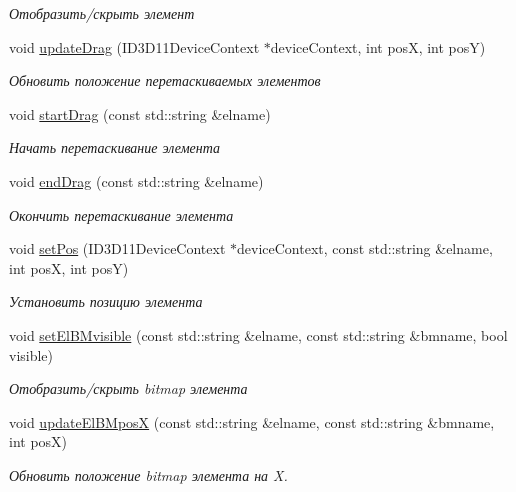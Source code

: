 \begin{DoxyCompactItemize}
\begin{DoxyCompactList}\small\item\em Отобразить/скрыть элемент \end{DoxyCompactList}\item 
void \hyperlink{class_interface_class_a0d1f5eb36e67f759bc4a61848cf27407}{update\+Drag} (I\+D3\+D11\+Device\+Context $\ast$device\+Context, int posX, int posY)
\begin{DoxyCompactList}\small\item\em Обновить положение перетаскиваемых элементов \end{DoxyCompactList}\item 
void \hyperlink{class_interface_class_aaa004dc4daea8a34d44d69678f7aee21}{start\+Drag} (const std\+::string \&elname)
\begin{DoxyCompactList}\small\item\em Начать перетаскивание элемента \end{DoxyCompactList}\item 
void \hyperlink{class_interface_class_a36e86575c8619d310c53fbdeff99b2fe}{end\+Drag} (const std\+::string \&elname)
\begin{DoxyCompactList}\small\item\em Окончить перетаскивание элемента \end{DoxyCompactList}\item 
void \hyperlink{class_interface_class_a969d115b4c904614a9f8a65bc64b062c}{set\+Pos} (I\+D3\+D11\+Device\+Context $\ast$device\+Context, const std\+::string \&elname, int posX, int posY)
\begin{DoxyCompactList}\small\item\em Установить позицию элемента \end{DoxyCompactList}\item 
void \hyperlink{class_interface_class_ad3a97e9c3d3d96dc725138952a9b3882}{set\+El\+B\+Mvisible} (const std\+::string \&elname, const std\+::string \&bmname, bool visible)
\begin{DoxyCompactList}\small\item\em Отобразить/скрыть bitmap элемента \end{DoxyCompactList}\item 
void \hyperlink{class_interface_class_aee673559015949315bde45d01acab097}{update\+El\+B\+MposX} (const std\+::string \&elname, const std\+::string \&bmname, int posX)
\begin{DoxyCompactList}\small\item\em Обновить положение bitmap элемента на X. \end{DoxyCompactList}\item 

\end{DoxyCompactItemize}
